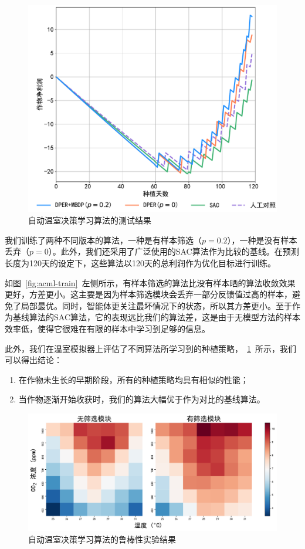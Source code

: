\begin{figure}[t]
\centering
\includegraphics[width=\textwidth]{figures/acml-test.pdf}
\caption{自动温室决策学习算法的测试结果}
\label{fig:acml-test}
\end{figure}

我们训练了两种不同版本的算法，一种是有样本筛选（$p=0.2$），一种是没有样本丢弃（$p=0$）。此外，我们还采用了广泛使用的SAC算法作为比较的基线。在预测长度为120天的设定下，这些算法以120天的总利润作为优化目标进行训练。

如图~\ref{fig:acml-train}~左侧所示，有样本筛选的算法比没有样本晒的算法收敛效果更好，方差更小。这主要是因为样本筛选模块会丢弃一部分反馈值过高的样本，避免了局部最优。同时，智能体更关注最坏情况下的状态，所以其方差更小。至于作为基线算法的SAC算法，它的表现远比我们的算法差，这是由于无模型方法的样本效率低，使得它很难在有限的样本中学习到足够的信息。

此外，我们在温室模拟器上评估了不同算法所学习到的种植策略，~\ref{fig:acml-test}~所示，我们可以得出结论：

\begin{enumerate}
    \item 在作物未生长的早期阶段，所有的种植策略均具有相似的性能；
    \item 当作物逐渐开始收获时，我们的算法大幅优于作为对比的基线算法。
\end{enumerate}


\begin{figure}
\centering
\includegraphics[width=\textwidth]{figures/robustness-heatmap-for-iros.pdf}
\caption{自动温室决策学习算法的鲁棒性实验结果}
\label{fig:robustness}
\end{figure}


